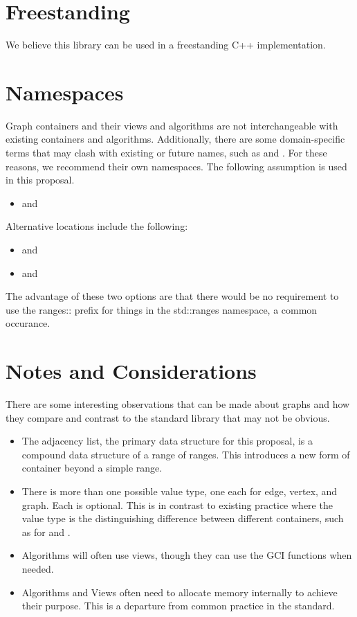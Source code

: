\section{Freestanding}
We believe this library can be used in a freestanding C++ implementation.

\section{Namespaces}
Graph containers and their views and algorithms are not interchangeable with existing containers and algorithms.
Additionally, there are some domain-specific terms that may clash with existing or future names, such as 
 and .
For these reasons, we recommend their own namespaces. The following assumption is used in this proposal.
\begin{itemize}
\item[] and 
\end{itemize}

\noindent
Alternative locations include the following:
\begin{itemize}
\item[] and 
\item[] and 
\end{itemize}
The advantage of these two options are that there would be no requirement to use the ranges:: prefix for things
in the std::ranges namespace, a common occurance.

\section{Notes and Considerations}
There are some interesting observations that can be made about graphs and how they compare and contrast to the 
standard library that may not be obvious.
\begin{itemize}
      \item The adjacency list, the primary data structure for this proposal, is a compound data structure of a
            range of ranges. This introduces a new form of container beyond a simple range.
      \item There is more than one possible value type, one each for edge, vertex, and graph. Each is optional.
            This is in contrast to existing practice where the value type is the distinguishing difference between
            different containers, such as for  and .
      \item Algorithms will often use views, though they can use the GCI functions when needed.
      \item Algorithms and Views often need to allocate memory internally to achieve their purpose. This is a departure from
            common practice in the standard.
\end{itemize}

